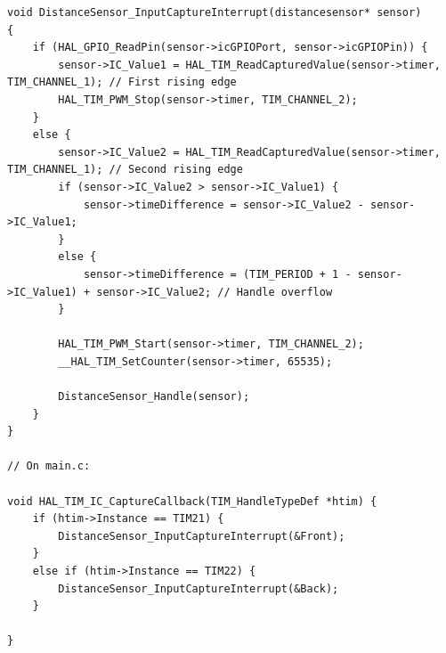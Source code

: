 \documentclass{article}
\begin{document}
\begin{lstlisting}[caption={Source Code : STM32 HC-SR04 Firmware}, label={lst:stm32_distancesensor_code}]
void DistanceSensor_InputCaptureInterrupt(distancesensor* sensor)
{
    if (HAL_GPIO_ReadPin(sensor->icGPIOPort, sensor->icGPIOPin)) {
        sensor->IC_Value1 = HAL_TIM_ReadCapturedValue(sensor->timer, TIM_CHANNEL_1); // First rising edge
        HAL_TIM_PWM_Stop(sensor->timer, TIM_CHANNEL_2);
    }
    else {
        sensor->IC_Value2 = HAL_TIM_ReadCapturedValue(sensor->timer, TIM_CHANNEL_1); // Second rising edge
        if (sensor->IC_Value2 > sensor->IC_Value1) {
            sensor->timeDifference = sensor->IC_Value2 - sensor->IC_Value1;
        }
        else {
            sensor->timeDifference = (TIM_PERIOD + 1 - sensor->IC_Value1) + sensor->IC_Value2; // Handle overflow
        }

        HAL_TIM_PWM_Start(sensor->timer, TIM_CHANNEL_2);
        __HAL_TIM_SetCounter(sensor->timer, 65535);

        DistanceSensor_Handle(sensor);
    }
}

// On main.c:

void HAL_TIM_IC_CaptureCallback(TIM_HandleTypeDef *htim) {
    if (htim->Instance == TIM21) {
		DistanceSensor_InputCaptureInterrupt(&Front);
	}
	else if (htim->Instance == TIM22) {
		DistanceSensor_InputCaptureInterrupt(&Back);
	}

}
\end{lstlisting}
\end{document}
